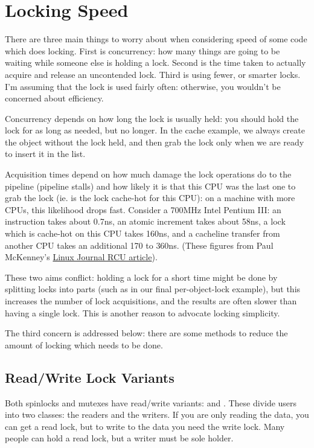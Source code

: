 \documentclass[a4paper,8pt,english]{sphinxmanual}
\begin{document}
\section{Locking Speed}
\label{kernel-hacking/locking:locking-speed}
There are three main things to worry about when considering speed of
some code which does locking. First is concurrency: how many things are
going to be waiting while someone else is holding a lock. Second is the
time taken to actually acquire and release an uncontended lock. Third is
using fewer, or smarter locks. I'm assuming that the lock is used fairly
often: otherwise, you wouldn't be concerned about efficiency.

Concurrency depends on how long the lock is usually held: you should
hold the lock for as long as needed, but no longer. In the cache
example, we always create the object without the lock held, and then
grab the lock only when we are ready to insert it in the list.

Acquisition times depend on how much damage the lock operations do to
the pipeline (pipeline stalls) and how likely it is that this CPU was
the last one to grab the lock (ie. is the lock cache-hot for this CPU):
on a machine with more CPUs, this likelihood drops fast. Consider a
700MHz Intel Pentium III: an instruction takes about 0.7ns, an atomic
increment takes about 58ns, a lock which is cache-hot on this CPU takes
160ns, and a cacheline transfer from another CPU takes an additional 170
to 360ns. (These figures from Paul McKenney's \href{http://www.linuxjournal.com/article.php?sid=6993}{Linux Journal RCU
article}).

These two aims conflict: holding a lock for a short time might be done
by splitting locks into parts (such as in our final per-object-lock
example), but this increases the number of lock acquisitions, and the
results are often slower than having a single lock. This is another
reason to advocate locking simplicity.

The third concern is addressed below: there are some methods to reduce
the amount of locking which needs to be done.


\subsection{Read/Write Lock Variants}
\label{kernel-hacking/locking:read-write-lock-variants}
Both spinlocks and mutexes have read/write variants:  and
. These divide
users into two classes: the readers and the writers. If you are only
reading the data, you can get a read lock, but to write to the data you
need the write lock. Many people can hold a read lock, but a writer must
be sole holder.
\end{document}
